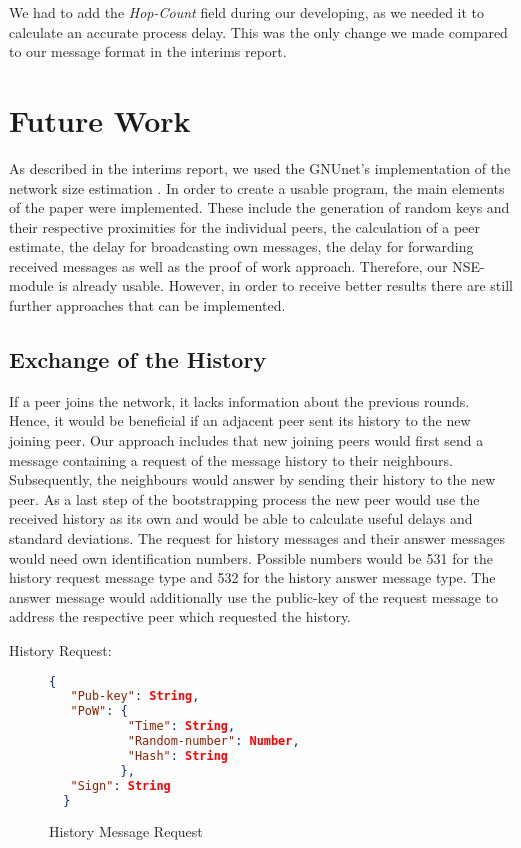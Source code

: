 \documentclass[IN,11pt,oneside,openright,english]{article}
\begin{document}
We had to add the \textit{Hop-Count} field during our developing, as we needed it to calculate an accurate process delay.
This was the only change we made compared to our message format in the interims report.

\section{Future Work}
As described in the interims report, we used the GNUnet's implementation of the network size estimation \cite{nse:1}. In order to create a usable program, the main elements of the paper were implemented. \newline
These include the generation of random keys and their respective proximities for the individual peers, the calculation of a peer estimate, the delay for broadcasting own messages, the delay for forwarding received messages as well as the proof of work approach. Therefore, our NSE-module is already usable. \newline
However, in order to receive better results there are still further approaches that can be implemented.

\subsection{Exchange of the History}
If a peer joins the network, it lacks information about the previous rounds. Hence, it would be beneficial if an adjacent peer sent its history to the new joining peer. \newline
Our approach includes that new joining peers would first send a message containing a request of the message history to their neighbours. Subsequently, the neighbours would answer by sending their history to the new peer. As a last step of the bootstrapping process the new peer would use the received history as its own and would be able to calculate useful delays and standard deviations. \newline
The request for history messages and their answer messages would need own identification numbers. Possible numbers would be 531 for the history request message type and 532 for the history answer message type. The answer message would additionally use the public-key of the request message to address the respective peer which requested the history.
\newline


History Request:
\begin{figure}[!h]
  \centering
  \begin{lstlisting}[language=json,firstnumber=1]
  {
   "Pub-key": String,
   "PoW": {
           "Time": String,
           "Random-number": Number,
           "Hash": String
          },
   "Sign": String
  }
  \end{lstlisting}
\caption{History Message Request}
\end{figure}
\end{document}
